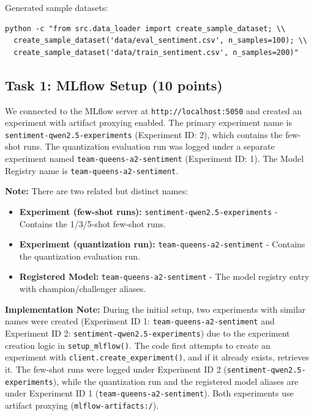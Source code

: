 \documentclass[11pt,a4paper]{article}
\begin{document}
Generated sample datasets:
\begin{verbatim}
python -c "from src.data_loader import create_sample_dataset; \\
  create_sample_dataset('data/eval_sentiment.csv', n_samples=100); \\
  create_sample_dataset('data/train_sentiment.csv', n_samples=200)"
\end{verbatim}



\subsection{Task 1: MLflow Setup (10 points)}

We connected to the MLflow server at \texttt{http://localhost:5050} and created an experiment with artifact proxying enabled. The primary experiment name is \texttt{sentiment-qwen2.5-experiments} (Experiment ID: 2), which contains the few-shot runs. The quantization evaluation run was logged under a separate experiment named \texttt{team-queens-a2-sentiment} (Experiment ID: 1). The Model Registry name is \texttt{team-queens-a2-sentiment}.

\textbf{Note:} There are two related but distinct names:
\begin{itemize}
\item \textbf{Experiment (few-shot runs):} \texttt{sentiment-qwen2.5-experiments} - Contains the 1/3/5-shot few-shot runs.
\item \textbf{Experiment (quantization run):} \texttt{team-queens-a2-sentiment} - Contains the quantization evaluation run.
\item \textbf{Registered Model:} \texttt{team-queens-a2-sentiment} - The model registry entry with champion/challenger aliases.
\end{itemize}

\textbf{Implementation Note:} During the initial setup, two experiments with similar names were created (Experiment ID 1: \texttt{team-queens-a2-sentiment} and Experiment ID 2: \texttt{sentiment-qwen2.5-experiments}) due to the experiment creation logic in \texttt{setup\_mlflow()}. The code first attempts to create an experiment with \texttt{client.create\_experiment()}, and if it already exists, retrieves it. The few-shot runs were logged under Experiment ID 2 (\texttt{sentiment-qwen2.5-experiments}), while the quantization run and the registered model aliases are under Experiment ID 1 (\texttt{team-queens-a2-sentiment}). Both experiments use artifact proxying (\texttt{mlflow-artifacts:/}).
\end{document}
